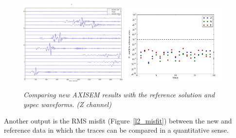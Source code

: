 \begin{figure}
  \includegraphics[width=0.48\textwidth]{./PYAXI/record_section_Z.png}
  \includegraphics[width=0.48\textwidth]{./PYAXI/l2_misfit.png}
  \caption{\textit{Comparing new AXISEM results with the reference solution and \textit{yspec} waveforms. (Z channel)}}
  \label{channel_Z}
\end{figure}

\noindent Another output is the RMS misfit (Figure~\ref{l2_misfit}) between the new and reference data 
in which the traces can be compared in a quantitative sense.

% 
